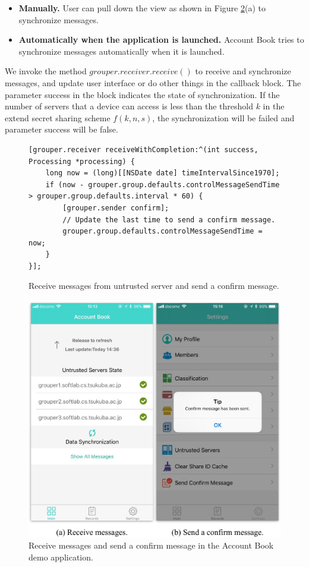 \documentclass[a4paper,11pt]{report}
\begin{document}
\begin{itemize}[leftmargin=7mm]
	\setlength{\itemsep}{1pt}
	\setlength{\parskip}{0pt}
	\setlength{\parsep}{0pt}
	\item \textbf{Manually.}
	User can pull down the view as shown in Figure \ref{fig:receive_messages_send_confirm}(a) to synchronize messages.
	\item \textbf{Automatically when the application is launched.} 
	Account Book tries to synchronize messages automatically when it is launched.
\end{itemize}

We invoke the method $grouper.receiver.receive()$ to receive and synchronize messages, and update user interface or do other things in the callback block.
The parameter success in the block indicates the state of synchronization.
If the number of servers that a device can access is less than the threshold $k$ in the extend secret sharing scheme $f(k, n, s)$, the synchronization will be failed and parameter success will be false.

\begin{figure}
\begin{lstlisting}[frame=none language=Objective-C] 
[grouper.receiver receiveWithCompletion:^(int success, Processing *processing) {
    long now = (long)[[NSDate date] timeIntervalSince1970];
    if (now - grouper.group.defaults.controlMessageSendTime > grouper.group.defaults.interval * 60) {
        [grouper.sender confirm];
        // Update the last time to send a confirm message.
        grouper.group.defaults.controlMessageSendTime = now;
    }
}];
\end{lstlisting}
\caption{Receive messages from untrusted server and send a confirm message.}
\label{fig:receive_with_completion}
\end{figure}

\begin{figure}[t]
	\centering
	\includegraphics[scale=0.8]{receive_confirm}
	\caption{Receive messages and send a confirm message in the Account Book demo application.}
	\label{fig:receive_messages_send_confirm}
\end{figure}
\end{document}
